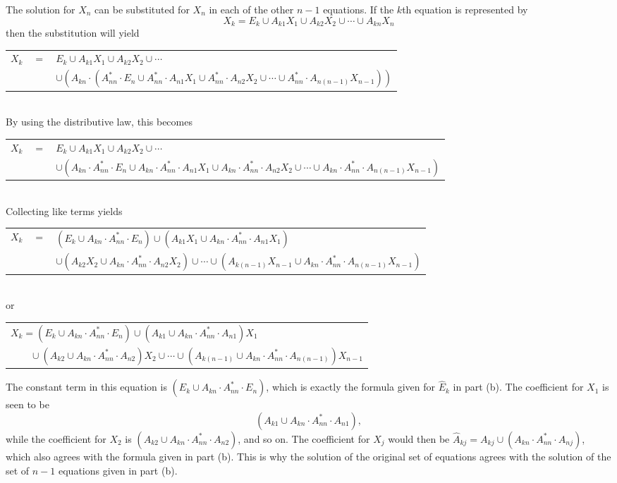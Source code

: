 \begin{thm}
The solution for $X_n$ can be substituted for $X_n$ in each of the other $n-1$
equations. If the $k$th equation is represented by
\[ X_k = E_k \cup A_{k1}X_1 \cup A_{k2}X_2 \cup \cdots \cup A_{kn}X_n \]
then the substitution will yield \\
\begin{tabular}{lll}
$X_k$ & $=$ & $E_k \cup A_{k1}X_1 \cup A_{k2}X_2 \cup \cdots$ \\
&& $\cup (A_{kn} \cdot (A^*_{nn} \cdot E_n \cup A^*_{nn} \cdot A_{n1}X_1 \cup
	A^*_{nn} \cdot A_{n2}X_2 \cup \cdots \cup A^*_{nn} \cdot
	A_{n(n-1)}X_{n-1}))$
\end{tabular} \\
By using the distributive law, this becomes \\
\begin{tabular}{lll}
$X_k$ & $=$ & $E_k \cup A_{k1}X_1 \cup A_{k2}X_2 \cup \cdots$ \\
&& $\cup (A_{kn} \cdot A^*_{nn} \cdot E_n \cup A_{kn} \cdot A^*_{nn} \cdot
	A_{n1}X_1 \cup A_{kn} \cdot A^*_{nn} \cdot A_{n2}X_2 \cup \cdots \cup
	A_{kn} \cdot A^*_{nn} \cdot A_{n(n-1)}X_{n-1})$
\end{tabular} \\
Collecting like terms yields \\
\begin{tabular}{lll}
$X_k$ & $=$ & $(E_k \cup A_{kn} \cdot A^*_{nn} \cdot E_n) \cup (A_{k1}X_1 \cup
	A_{kn} \cdot A^*_{nn} \cdot A_{n1}X_1)$ \\
&& $\cup (A_{k2}X_2 \cup A_{kn} \cdot A^*_{nn} \cdot A_{n2}X_2) \cup \cdots \cup
	(A_{k(n-1)}X_{n-1} \cup A_{kn} \cdot A^*_{nn} \cdot A_{n(n-1)}X_{n-1})$
\end{tabular} \\
or
\begin{center}\begin{tabular}{l}
$X_k = (E_k \cup A_{kn} \cdot A^*_{nn} \cdot E_n) \cup (A_{k1} \cup A_{kn}
	\cdot A^*_{nn} \cdot A_{n1})X_1$ \\
$\qquad \cup (A_{k2} \cup A_{kn} \cdot A^*_{nn} \cdot A_{n2})X_2 \cup \cdots
	\cup (A_{k(n-1)} \cup A_{kn} \cdot A^*_{nn} \cdot A_{n(n-1)})X_{n-1}$
\end{tabular}\end{center}
The constant term in this equation is $(E_k \cup A_{kn} \cdot A^*_{nn} \cdot
E_n)$, which is exactly the formula given for $\hat{E}_k$ in part (b). The
coefficient for $X_1$ is seen to be
\[ (A_{k1} \cup A_{kn} \cdot A^*_{nn} \cdot A_{n1}), \]
while the coefficient for $X_2$ is $(A_{k2} \cup A_{kn} \cdot A^*_{nn} \cdot
A_{n2})$, and so on. The coefficient for $X_j$ would then be $\hat{A}_{kj} =
A_{kj} \cup (A_{kn} \cdot A^*_{nn} \cdot A_{nj})$, which also agrees with the
formula given in part (b). This is why the solution of the original set of
equations agrees with the solution of the set of $n-1$ equations given in part
(b).


\end{thm}
